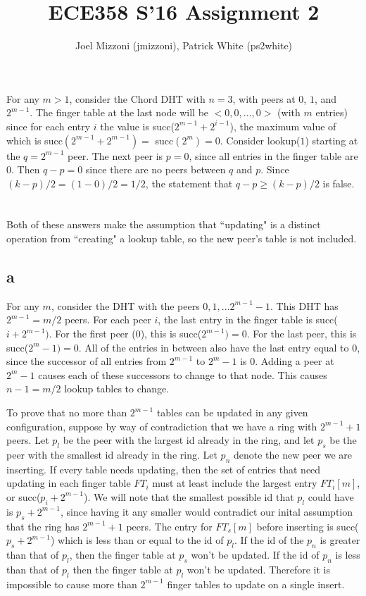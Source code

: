 \documentclass[10pt,a4paper]{article}
\author{Joel Mizzoni (jmizzoni), Patrick White (ps2white)}
\begin{document}
\title{ECE358 S'16 Assignment 2}
\maketitle
\section{}

For any $m>1$, consider the Chord DHT with $n=3$, with peers at $0$, $1$, and $2^{m-1}$.
The finger table at the last node will be $<0,0,...,0>$ (with $m$ entries) since for each entry $i$ the value is succ($2^{m-1}+2^{i-1}$), the maximum value of which is succ$(2^{m-1}+2^{m-1})=$ succ$(2^m)=0$.
Consider lookup($1$) starting at the $q=2^{m-1}$ peer. The next peer is $p=0$, since all entries in the finger table are $0$. Then $q-p=0$ since there are no peers between $q$ and $p$.
Since $(k-p)/2=(1-0)/2=1/2$, the statement that $q-p\geq (k-p)/2$ is false.
\section{}
Both of these answers make the assumption that ``updating" is a distinct operation from ``creating" a lookup table, so the new peer's table is not included.
\subsection*{a}
For any $m$, consider the DHT with the peers $0,1,...2^{m-1}-1$. This DHT has $2^{m-1}=m/2$ peers. For each peer $i$, the last entry in the finger table is succ($i+2^{m-1})$. For the first peer (0), this is succ($2^{m-1})=0$. For the last peer, this is succ($2^{m}-1)=0$. All of the entries in between also have the last entry equal to $0$, since the successor of all entries from $2^{m-1}$ to $2^m-1$ is 0. Adding a peer at $2^{m}-1$ causes each of these successors to change to that node. This causes $n-1=m/2$ lookup tables to change.

To prove that no more than $2^{m-1}$ tables can be updated in any given configuration, suppose by way of contradiction that we have a ring with $2^{m-1} + 1 $ peers. Let $p_l$ be the peer with the largest id already in the ring, and let $p_s$ be the peer with the smallest id already in the ring. Let $p_n$ denote the new peer we are inserting. If every table needs updating, then the set of entries that need updating in each finger table $FT_i$ must at least include the largest entry $FT_i[m]$, or succ($p_i + 2^{m-1}$). We will note that the smallest possible id that $p_l$ could have is $p_s + 2^{m-1}$, since having it any smaller would contradict our inital assumption that the ring has $2^{m-1} + 1$ peers. The entry for $FT_s[m]$ before inserting is succ($p_s + 2^{m-1}$) which is less than or equal to the id of $p_l$. If the id of the $p_n$ is greater than that of $p_l$, then the finger table at $p_s$ won't be updated. If the id of $p_n$ is less than that of $p_l$ then the finger table at $p_l$ won't be updated. Therefore it is impossible to cause more than $2^{m-1}$ finger tables to update on a single insert. 
\end{document}
